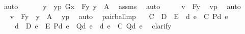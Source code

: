 \begin{isabellebody}
\ auto\ \isanewline
\ \ \isamarkupfalse%
\ \isamarkupfalse%
\ y\ \ yp{\isacharcolon}{\kern0pt}\ {\isachardoublequoteopen}G{\isacharparenleft}{\kern0pt}x{\isacharparenright}{\kern0pt}\ {\isacharequal}{\kern0pt}\ F{\isacharparenleft}{\kern0pt}y{\isacharparenright}{\kern0pt}{\isachardoublequoteclose}\ {\isachardoublequoteopen}y\ {\isasymin}\ A{\isachardoublequoteclose}\ \isamarkupfalse%
\ assms\ \isamarkupfalse%
\ auto\isanewline
\ \ \isamarkupfalse%
\ \isamarkupfalse%
\ {\isachardoublequoteopen}v\ {\isacharequal}{\kern0pt}\ F{\isacharparenleft}{\kern0pt}y{\isacharparenright}{\kern0pt}{\isachardoublequoteclose}\ \isamarkupfalse%
\ vp\ \isamarkupfalse%
\ auto\ \isanewline
\ \ \isamarkupfalse%
\ \isamarkupfalse%
\ {\isachardoublequoteopen}v\ {\isasymin}\ {\isacharbraceleft}{\kern0pt}F{\isacharparenleft}{\kern0pt}y{\isacharparenright}{\kern0pt}\ {\isachardot}{\kern0pt}\ y\ {\isasymin}\ A{\isacharbraceright}{\kern0pt}{\isachardoublequoteclose}\ \isamarkupfalse%
\ yp\ \isamarkupfalse%
\ auto\ \isanewline
{}\isamarkupfalse%
%
\endisatagproof
{\isafoldproof}%
%
\isadelimproof
\isanewline
%
\endisadelimproof
\isanewline
\isanewline
{}\isamarkupfalse%
\ pair{\isacharunderscore}{\kern0pt}ball{\isacharunderscore}{\kern0pt}mp\ {\isacharcolon}{\kern0pt}\isanewline
\ \ {\isachardoublequoteopen}C\ {\isasymsubseteq}\ D\ {\isasymtimes}\ E\ {\isasymLongrightarrow}\ {\isasymforall}{\isacharless}{\kern0pt}d{\isacharcomma}{\kern0pt}\ e{\isachargreater}{\kern0pt}\ {\isasymin}\ C{\isachardot}{\kern0pt}\ P{\isacharparenleft}{\kern0pt}d{\isacharcomma}{\kern0pt}\ e{\isacharparenright}{\kern0pt}\isanewline
\ \ \ {\isasymLongrightarrow}\ {\isasymforall}d\ {\isasymin}\ D{\isachardot}{\kern0pt}\ {\isasymforall}e\ {\isasymin}\ E{\isachardot}{\kern0pt}\ P{\isacharparenleft}{\kern0pt}d{\isacharcomma}{\kern0pt}\ e{\isacharparenright}{\kern0pt}\ {\isasymlongrightarrow}\ Q{\isacharparenleft}{\kern0pt}d{\isacharcomma}{\kern0pt}\ e{\isacharparenright}{\kern0pt}\ {\isasymLongrightarrow}\ {\isasymforall}{\isacharless}{\kern0pt}d{\isacharcomma}{\kern0pt}\ e{\isachargreater}{\kern0pt}\ {\isasymin}\ C{\isachardot}{\kern0pt}\ Q{\isacharparenleft}{\kern0pt}d{\isacharcomma}{\kern0pt}\ e{\isacharparenright}{\kern0pt}{\isachardoublequoteclose}\ \isanewline
%
\isadelimproof
%
\endisadelimproof
%
\isatagproof
{}\isamarkupfalse%
\ {\isacharparenleft}{\kern0pt}clarify{\isacharparenright}{\kern0pt}\isanewline

\end{isabellebody}
